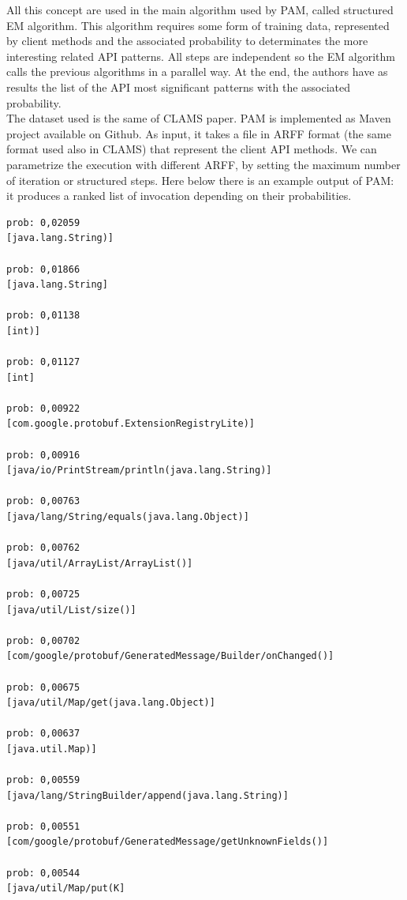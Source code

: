 All this concept are used in the main algorithm used by PAM, called structured EM algorithm. This algorithm requires some form of training data, represented by client methods and the associated probability to determinates the more interesting related API patterns. All steps are independent so the EM algorithm calls the previous algorithms in a parallel way. At the end, the authors have as results the list of the API most significant patterns with the associated probability. \\
The dataset used is the same of CLAMS paper. PAM is implemented as Maven project available on Github. As input, it takes a file in ARFF format (the same format used also in CLAMS) that represent the client API methods. We can parametrize the execution with different ARFF, by setting the maximum number of iteration or structured steps. Here below there is an example output of PAM: it produces a ranked list of invocation depending on their probabilities. 

\begin{lstlisting}
prob: 0,02059
[java.lang.String)]

prob: 0,01866
[java.lang.String]

prob: 0,01138
[int)]

prob: 0,01127
[int]

prob: 0,00922
[com.google.protobuf.ExtensionRegistryLite)]

prob: 0,00916
[java/io/PrintStream/println(java.lang.String)]

prob: 0,00763
[java/lang/String/equals(java.lang.Object)]

prob: 0,00762
[java/util/ArrayList/ArrayList()]

prob: 0,00725
[java/util/List/size()]

prob: 0,00702
[com/google/protobuf/GeneratedMessage/Builder/onChanged()]

prob: 0,00675
[java/util/Map/get(java.lang.Object)]

prob: 0,00637
[java.util.Map)]

prob: 0,00559
[java/lang/StringBuilder/append(java.lang.String)]

prob: 0,00551
[com/google/protobuf/GeneratedMessage/getUnknownFields()]

prob: 0,00544
[java/util/Map/put(K]

\end{lstlisting}

